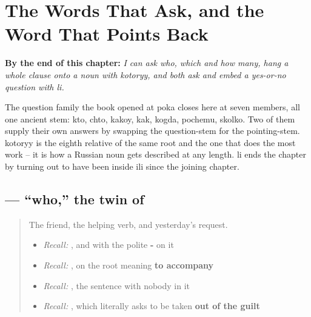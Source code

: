 
\chapter{The Words That Ask, and the Word That Points Back}
\label{ch:ru-question-family}

\begin{chapteropening}
\textbf{By the end of this chapter:} \emph{I can ask who, which and how many, hang a whole clause onto a noun with kotoryy, and both ask and embed a yes-or-no question with li.}

The question family the book opened at poka closes here at seven members, all one ancient stem: kto, chto, kakoy, kak, kogda, pochemu, skolko. Two of them supply their own answers by swapping the question-stem for the pointing-stem. kotoryy is the eighth relative of the same root and the one that does the most work -- it is how a Russian noun gets described at any length. li ends the chapter by turning out to have been inside ili since the joining chapter.
\end{chapteropening}

\section[\texorpdfstring{\ru{кто} (kto)}{кто (kto)}]{ — \textquotedblleft{}who,\textquotedblright{} the twin of }

\label{lesson:RU-C22-kto}



\begin{quote}
The friend, the helping verb, and yesterday's request.

\begin{itemize}
\raggedright
  \item \emph{Recall:} \emph{}, and \emph{} with the polite \textbf{-} on it
  \item \emph{Recall:} \emph{}, on the root meaning \textbf{to accompany}
  \item \emph{Recall:} \emph{}, the sentence with nobody in it
  \item \emph{Recall:} \emph{}, which literally asks to be taken \textbf{out of the guilt}
\end{itemize}
\end{quote}

